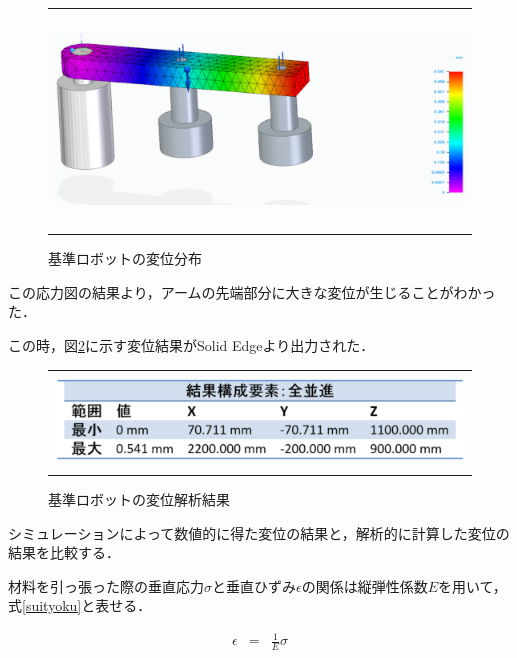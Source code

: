 \begin{figure}[htbp]
  \begin{center}
    \begin{tabular}{c}
      \includegraphics[height=5.7cm]{img/eps/default-heni.eps}
    \end{tabular}
    \caption{基準ロボットの変位分布}
    \label{basis-heni}
  \end{center}
\end{figure}

この応力図の結果より，アームの先端部分に大きな変位が生じることがわかった．

この時，図\ref{default-heni-result}に示す変位結果がSolid
Edgeより出力された．

\begin{figure}[htbp]
  \begin{center}
    \begin{tabular}{c}
      \includegraphics[height=2.5cm]{img/eps/default-heni-result.eps}
    \end{tabular}
    \caption{基準ロボットの変位解析結果}
    \label{default-heni-result}
  \end{center}
\end{figure}

シミュレーションによって数値的に得た変位の結果と，解析的に計算した変位の結果を比較する．

材料を引っ張った際の垂直応力\(\sigma\)と垂直ひずみ\(\epsilon\)の関係は縦弾性係数\(E\)を用いて，式\ref{suityoku}と表せる．

\begin{eqnarray}
  \epsilon &=& \frac{1}{E}\sigma
  \label{suityoku}
\end{eqnarray}

